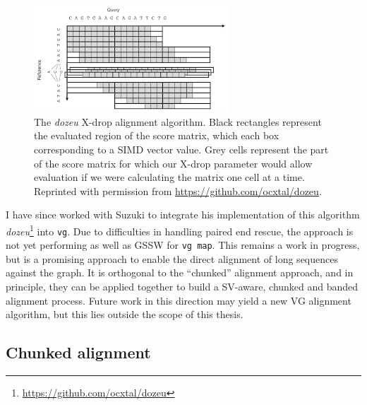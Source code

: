 \begin{figure}[htbp!] 
\centering    
\includegraphics[width=0.65\textwidth]{Chapter2/Figs/xdrop.png}
\caption[The \emph{dozeu} X-drop alignment algorithm]{
  The \emph{dozeu} X-drop alignment algorithm.
  Black rectangles represent the evaluated region of the score matrix, which each box corresponding to a SIMD vector value.
  Grey cells represent the part of the score matrix for which our X-drop parameter would allow evaluation if we were calculating the matrix one cell at a time.
  Reprinted with permission from \url{https://github.com/ocxtal/dozeu}.
}
\label{fig:xdrop}
\end{figure}

I have since worked with Suzuki to integrate his implementation of this algorithm \emph{dozeu}\footnote{\url{https://github.com/ocxtal/dozeu}} into {\tt vg}.
Due to difficulties in handling paired end rescue, the approach is not yet performing as well as GSSW for {\tt vg map}.
This remains a work in progress, but is a promising approach to enable the direct alignment of long sequences against the graph.
It is orthogonal to the ``chunked'' alignment approach, and in principle, they can be applied together to build a SV-aware, chunked and banded alignment process.
Future work in this direction may yield a new VG alignment algorithm, but this lies outside the scope of this thesis.

\subsection{Chunked alignment}
\label{sec:chunked_alignment}

